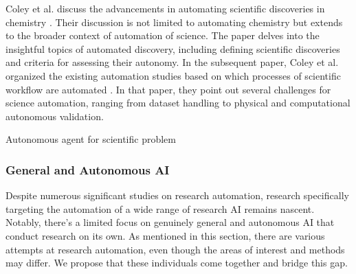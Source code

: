 Coley et al. discuss the advancements in automating scientific discoveries in chemistry \cite{coley2020autonomous}. Their discussion is not limited to automating chemistry but extends to the broader context of automation of science. The paper delves into the insightful topics of automated discovery, including defining scientific discoveries and criteria for assessing their autonomy. In the subsequent paper, Coley et al. organized the existing automation studies based on which processes of scientific workflow are automated \cite{coley2020autonomousII}. In that paper, they point out several challenges for science automation, ranging from dataset handling to physical and computational autonomous validation. 

Autonomous agent for scientific problem \cite{wang2023survey}


\subsubsection{General and Autonomous AI}
Despite numerous significant studies on research automation, research specifically targeting the automation of a wide range of research AI remains nascent. Notably, there's a limited focus on genuinely general and autonomous AI that conduct research on its own. As mentioned in this section, there are various attempts at research automation, even though the areas of interest and methods may differ. We propose that these individuals come together and bridge this gap.





